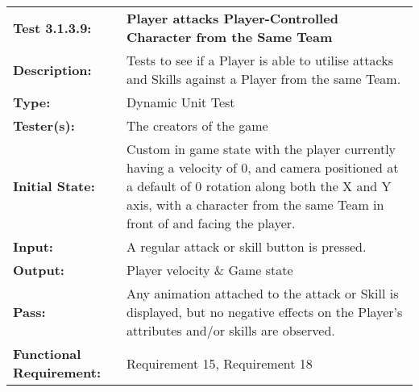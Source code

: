 \documentclass[12pt, titlepage]{article}
\begin{document}
\begin{mdframed}[linewidth=1pt]
\begin{tabularx}{\textwidth}{@{}p{3cm}X@{}}
{\bf Test 3.1.3.9:} & {\bf Player attacks Player-Controlled Character from the Same Team}\\[\baselineskip]
{\bf Description:} & Tests to see if a Player is able to utilise attacks and Skills against a Player from the same Team. \\[0.5\baselineskip]
{\bf Type:} & Dynamic Unit Test\\[0.5\baselineskip]
{\bf Tester(s):} & The creators of the game\\[0.5\baselineskip]
{\bf Initial State:} & Custom in game state with the player currently having a velocity of 0, and camera positioned at a default of 0 rotation along both the X and Y axis, with a character from the same Team in front of and facing the player. \\[0.5\baselineskip]
{\bf Input:} & A regular attack or skill button is pressed. \\[0.5\baselineskip]
{\bf Output:} & Player velocity \& Game state\\[0.5\baselineskip]
{\bf Pass:} & Any animation attached to the attack or Skill is displayed, but no negative effects on the Player's attributes and/or skills are observed.  \\[0.5\baselineskip]
{\bf Functional Requirement:} & Requirement 15, Requirement 18
\end{tabularx}
\end{mdframed}
\end{document}
